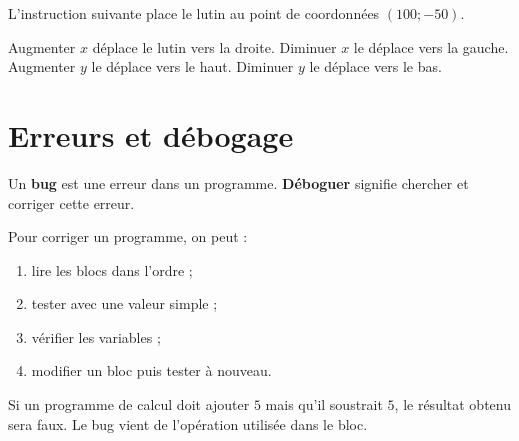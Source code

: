 \documentclass[a4paper,10pt]{report}
\begin{document}
\begin{center}
\end{center}

\begin{exemple}
L'instruction suivante place le lutin au point de coordonnées $(100;-50)$.

\begin{center}
\begin{scratch}
\end{scratch}
\end{center}
\end{exemple}

\begin{rem}
Augmenter $x$ déplace le lutin vers la droite. Diminuer $x$ le déplace vers la gauche. Augmenter $y$ le déplace vers le haut. Diminuer $y$ le déplace vers le bas.
\end{rem}

\section{Erreurs et débogage}

\begin{defn}
Un \textbf{bug} est une erreur dans un programme. \textbf{Déboguer} signifie chercher et corriger cette erreur.
\end{defn}

\begin{meth}
Pour corriger un programme, on peut :
\begin{enumerate}
\item lire les blocs dans l'ordre ;
\item tester avec une valeur simple ;
\item vérifier les variables ;
\item modifier un bloc puis tester à nouveau.
\end{enumerate}
\end{meth}

\begin{exemple}
Si un programme de calcul doit ajouter $5$ mais qu'il soustrait $5$, le résultat obtenu sera faux. Le bug vient de l'opération utilisée dans le bloc.
\end{exemple}
\end{document}
